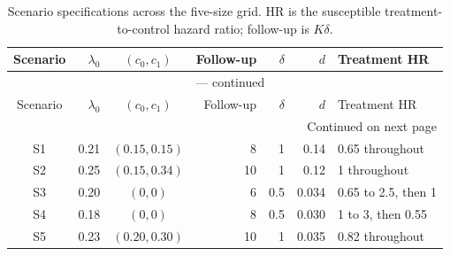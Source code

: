 \documentclass[12pt]{article}
\theoremstyle{definition}
\theoremstyle{remark}
\begin{document}
\begingroup
\scriptsize
\setlength{\tabcolsep}{3pt}
\renewcommand{\arraystretch}{1.10}
\setlength{\LTcapwidth}{\textwidth}
\begin{longtable}{crcrrrl}
\caption{Scenario specifications across the five-size grid. HR is the susceptible treatment-to-control hazard ratio; follow-up is $K\delta$.}\label{tab:simulation-scenarios}\\
\toprule
Scenario & $\lambda_0$ & $(c_0,c_1)$ & Follow-up & $\delta$ & $d$ & Treatment HR \\
\midrule
\endfirsthead
\multicolumn{7}{c}{\tablename\ \thetable{} --- continued}\\
\toprule
Scenario & $\lambda_0$ & $(c_0,c_1)$ & Follow-up & $\delta$ & $d$ & Treatment HR \\
\midrule
\endhead
\midrule
\multicolumn{7}{r}{Continued on next page}\\
\endfoot
\bottomrule
\endlastfoot
S1 & 0.21 & $(0.15,0.15)$ & 8 & 1 & 0.14 & 0.65 throughout \\
S2 & 0.25 & $(0.15,0.34)$ & 10 & 1 & 0.12 & 1 throughout \\
S3 & 0.20 & $(0,0)$ & 6 & 0.5 & 0.034 & 0.65 to 2.5, then 1 \\
S4 & 0.18 & $(0,0)$ & 8 & 0.5 & 0.030 & 1 to 3, then 0.55 \\
S5 & 0.23 & $(0.20,0.30)$ & 10 & 1 & 0.035 & 0.82 throughout \\
\end{longtable}
\endgroup
\end{document}
